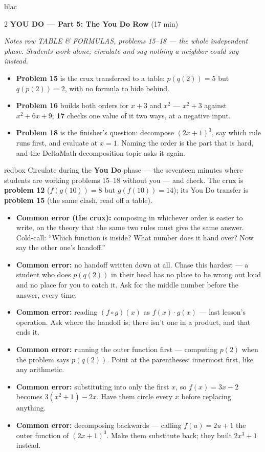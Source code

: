 \documentclass[10pt]{article}
\begin{document}
\begin{skillbox}{lilac}
\begin{multicols}{2}
\textbf{YOU DO --- Part 5: The You Do Row} (17 min)

\textit{Notes row TABLE \& FORMULAS, problems 15--18 --- the whole independent
phase. Students work alone; circulate and say nothing a neighbor could say
instead.}
\begin{itemize}
  \item \textbf{Problem 15} is the crux transferred to a table: $p(q(2)) = 5$ but
        $q(p(2)) = 2$, with no formula to hide behind.
  \item \textbf{Problem 16} builds both orders for $x+3$ and $x^2$ ---
        $x^2 + 3$ against $x^2 + 6x + 9$; \textbf{17} checks one value of it two
        ways, at a negative input.
  \item \textbf{Problem 18} is the finisher's question: decompose $(2x+1)^3$,
        say which rule runs first, and evaluate at $x = 1$. Naming the order is
        the part that is hard, and the DeltaMath decomposition topic asks it again.
\end{itemize}
\end{multicols}
\end{skillbox}

\begin{skillbox}{redbox}
Circulate during the \textbf{You Do} phase --- the seventeen minutes where students are working
problems 15--18 without you --- and check. The crux is \textbf{problem 12} ($f(g(10)) = 8$ but
$g(f(10)) = 14$); its You Do transfer is \textbf{problem 15} (the same clash, read off a table).
\begin{itemize}
  \item \textbf{Common error (the crux):} composing in whichever order is easier to write, on
        the theory that the same two rules must give the same answer. Cold-call: ``Which function
        is inside? What number does it hand over? Now say the other one's handoff.''
  \item \textbf{Common error:} no handoff written down at all. Chase this hardest --- a student
        who does $p(q(2))$ in their head has no place to be wrong out loud and no place for you
        to catch it. Ask for the middle number before the answer, every time.
  \item \textbf{Common error:} reading $(f \circ g)(x)$ as $f(x) \cdot g(x)$ --- last lesson's
        operation. Ask where the handoff is; there isn't one in a product, and that ends it.
  \item \textbf{Common error:} running the outer function first --- computing $p(2)$ when the
        problem says $p(q(2))$. Point at the parentheses: innermost first, like any arithmetic.
  \item \textbf{Common error:} substituting into only the first $x$, so $f(x) = 3x - 2$ becomes
        $3(x^2+1) - 2x$. Have them circle every $x$ before replacing anything.
  \item \textbf{Common error:} decomposing backwards --- calling $f(u) = 2u + 1$ the outer
        function of $(2x+1)^3$. Make them substitute back; they built $2x^3 + 1$ instead.
\end{itemize}
\end{skillbox}
\end{document}
